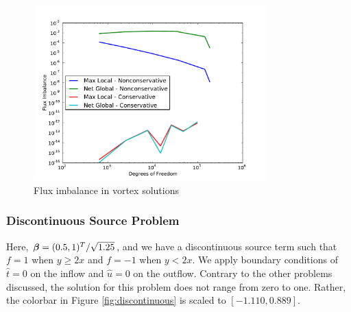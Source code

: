 \documentclass[Proposal.tex]{subfiles}
\begin{document}
\begin{figure}[p]
\centering
\includegraphics[width=0.8\textwidth]{figs/Vortex/modifiedFlux.pdf}
\caption{Flux imbalance in vortex solutions}
\label{fig:vortex_flux}
\end{figure}

\subsubsection{Discontinuous Source Problem}
Here, $\boldsymbol\beta=(0.5,1)^T/\sqrt{1.25}$, and we have a discontinuous source term
such that $f=1$ when $y\ge2x$ and $f=-1$ when $y<2x$. We apply boundary
conditions of $\hat t=0$ on the inflow and $\hat u=0$ on the outflow. Contrary
to the other problems discussed, the solution for this problem does not range
from zero to one. Rather, the colorbar in Figure \ref{fig:discontinuous} is
scaled to  $[-1.110,0.889]$.
\end{document}
